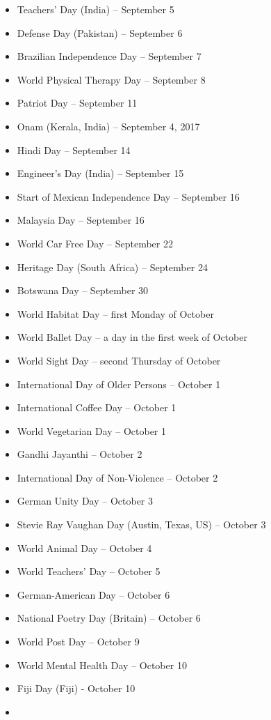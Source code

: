 \documentclass[
]{book}
\begin{document}
\begin{itemize}
\item
  Teachers' Day (India) -- September 5
\item
  Defense Day (Pakistan) -- September 6
\item
  Brazilian Independence Day -- September 7
\item
  World Physical Therapy Day -- September 8
\item
  Patriot Day -- September 11
\item
  Onam (Kerala, India) -- September 4, 2017
\item
  Hindi Day -- September 14
\item
  Engineer's Day (India) -- September 15
\item
  Start of Mexican Independence Day -- September 16
\item
  Malaysia Day -- September 16
\item
  World Car Free Day -- September 22
\item
  Heritage Day (South Africa) -- September 24
\item
  Botswana Day -- September 30
\item
  World Habitat Day -- first Monday of October
\item
  World Ballet Day -- a day in the first week of October
\item
  World Sight Day -- second Thursday of October
\item
  International Day of Older Persons -- October 1
\item
  International Coffee Day -- October 1
\item
  World Vegetarian Day -- October 1
\item
  Gandhi Jayanthi -- October 2
\item
  International Day of Non-Violence -- October 2
\item
  German Unity Day -- October 3
\item
  Stevie Ray Vaughan Day (Austin, Texas, US) -- October 3
\item
  World Animal Day -- October 4
\item
  World Teachers' Day -- October 5
\item
  German-American Day -- October 6
\item
  National Poetry Day (Britain) -- October 6
\item
  World Post Day -- October 9
\item
  World Mental Health Day -- October 10
\item
  Fiji Day (Fiji) - October 10
\item

\end{itemize}
\end{document}
